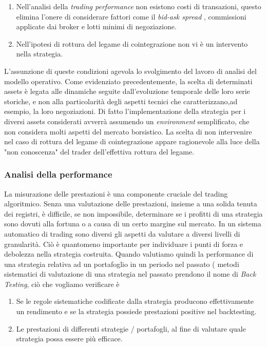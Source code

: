 \documentclass[]{article}
\begin{document}
\begin{enumerate}
	\item Nell'analisi della \textit{trading performance} non esistono costi di transazioni, questo elimina l'onere di considerare fattori come il \textit{bid-ask spread} , commissioni applicate dai broker e lotti minimi di negoziazione.
	\item Nell'ipotesi di rottura del legame di cointegrazione non vi è un intervento nella strategia.
\end{enumerate}

L'assunzione di queste condizioni agevola lo svolgimento del lavoro di analisi del modello operativo. Come evidenziato precedentemente, la scelta di determinati assets è legata alle dinamiche seguite dall'evoluzione temporale delle loro serie storiche, e non alla particolarità degli aspetti tecnici che caratterizzano,ad esempio, la loro negoziazioni. Di fatto l'implementazione della strategia per i diversi assets considerati avverrà assumendo un \textit{environment} semplificato, che non considera molti aspetti del mercato borsistico.
La scelta di non intervenire nel caso di rottura del legame di cointegrazione appare ragionevole alla luce della "non conoscenza" del trader dell'effettiva rottura del legame. 
\subsubsection{Analisi della performance}

La misurazione delle prestazioni è una componente cruciale del trading algoritmico. Senza una valutazione delle prestazioni, insieme a una solida tenuta dei registri, è difficile, se non impossibile, determinare se i profitti di una strategia sono dovuti alla fortuna o a causa di un certo margine sul mercato.
In un sistema automatico di trading sono diversi gli aspetti da valutare a diversi livelli di granularità. Ciò è quantomeno importante per individuare i punti di forza e debolezza nella strategia costruita.
Quando valutiamo quindi la performance di una strategia relativa ad un portafoglio in un periodo nel passato ( metodi sistematici di valutazione di una strategia nel passato prendono il nome di \textit{Back Testing}, ciò che vogliamo verificare è

\begin{enumerate}
	\item Se le regole sistematiche codificate dalla strategia producono effettivamente un rendimento e se la strategia possiede prestazioni positive nel backtesting.
	\item Le prestazioni di differenti strategie / portafogli, al fine di valutare quale strategia possa essere più efficace.
\end{enumerate}
\end{document}

